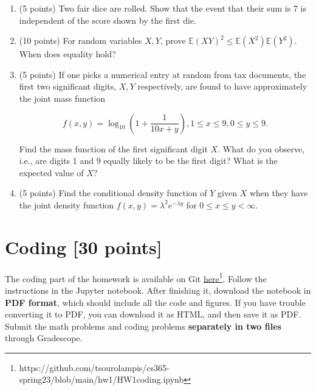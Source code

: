 \begin{tcolorbox}
	\begin{enumerate}
		\item  (5 points)  Two fair dice are rolled. Show that the event that their sum is 7 is independent of the score shown by the first die.  
         \item  (10 points)    For random variables $X,Y$, prove $\mathbb{E}(XY)^2 \leq \mathbb{E}(X^2)\mathbb{E}(Y^2)$. When does equality hold?
    
         \item  (5 points)   If one picks a numerical entry at random from tax documents, the first two significant digits, $X, Y$ respectively, are found to have approximately the joint mass function 

         $$ f(x,y) = \log_{10}(1+\frac{1}{10x+y}), 1\leq x\leq 9, 0\leq y\leq 9.$$

         Find the mass function of the first significant digit $X$. What do you observe, i.e., are digits 1 and 9 equally likely to be the first digit? What is the expected value of $X$?  

         \item  (5 points)  Find the conditional density function  of $Y$ given $X$ when they have the joint density function $f(x,y)=\lambda^2 e^{-\lambda y}$ for $0\leq x \leq y<\infty$. 
	\end{enumerate}


\end{tcolorbox}
 
  \section{Coding [30 points]}

  The coding part of the homework is available on Git \href{https://github.com/tsourolampis/cs365-spring23/tree/main/hw1}{here}\footnote{https://github.com/tsourolampis/cs365-spring23/blob/main/hw1/HW1coding.ipynb}. Follow the instructions in the Jupyter notebook. After finishing it, download the notebook in \textbf{PDF format}, which should include all the code and figures. If you have trouble converting it to PDF, you can download it as HTML, and then save it as PDF. Submit the math problems and coding problems \textbf{separately in two files} through Gradescope.

